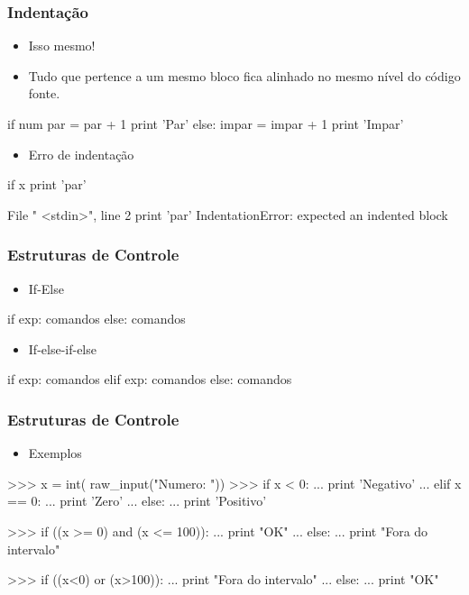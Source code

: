 \documentclass[12pt,t,graphics]{beamer}
\newcommand{\ft}[1]{\frametitle{#1}}
\newcommand{\bi}{\begin{itemize}}
\newcommand{\ei}{\end{itemize}}
\begin{document}

\begin{frame}[fragile]
  \ft{Indentação}
  \bi
\item Isso mesmo!
\item Tudo que pertence a um mesmo bloco fica alinhado
  no mesmo nível do código fonte.	
  \ei	
  \begin{python}
if num %
    par = par + 1
    print 'Par'
else:
    impar = impar + 1
    print 'Impar'
  \end{python}
  \bi
\item Erro de indentação
  \ei
  \begin{python}
if x %
print 'par'

File " <stdin>", line 2
print 'par'
IndentationError: expected an indented block
  \end{python}
\end{frame}


\begin{frame}[fragile]
  \ft{Estruturas de Controle}
  \bi
\item If-Else
  \ei	
  \begin{python}
if exp:
    comandos
else:
    comandos		
  \end{python}
  \bi
\item If-else-if-else
  \ei
  \begin{python}
if exp:
    comandos
elif exp:
    comandos
else:
    comandos		
  \end{python}	
\end{frame}


\begin{frame}[fragile]
  \ft{Estruturas de Controle}
  \bi
\item Exemplos
  \ei	
  \begin{python}
>>> x = int( raw_input("Numero: "))
>>> if x < 0:
...     print 'Negativo'
... elif x == 0:
...     print 'Zero'
... else:
...     print 'Positivo'

>>> if ((x >= 0) and (x <= 100)):
...     print "OK"
... else:
...     print "Fora do intervalo"

>>> if ((x<0) or (x>100)):
...     print "Fora do intervalo"
... else:
...     print "OK"		
  \end{python}		
\end{frame}
\end{document}
